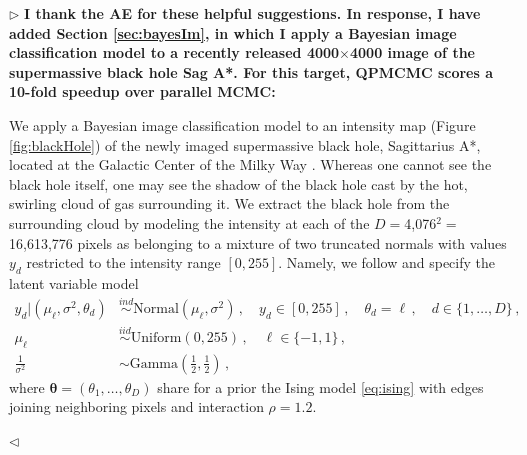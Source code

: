 \documentclass[12pt]{article}
\newenvironment{reply}{$\triangleright$\bfseries}{$\triangleleft$}
\renewenvironment{quote}
               {\list{}{\rightmargin\leftmargin}%
                \item\relax\normalfont}
               {\endlist}
\newcommand{\ttheta}{\boldsymbol{\theta}}
\begin{document}
\begin{reply}
	I thank the AE for these helpful suggestions. In response, I have added Section \ref{sec:bayesIm}, in which I apply a Bayesian image classification model to a recently released 4000$\times$4000 image of the supermassive black hole Sag A*.  For this target, QPMCMC scores a 10-fold speedup over parallel MCMC:
	\begin{quote}
		We apply a Bayesian image classification model to an intensity map (Figure \ref{fig:blackHole}) of the newly imaged supermassive black hole, Sagittarius A*, located at the Galactic Center of the Milky Way \citep{akiyama2022first}.  Whereas one cannot see the black hole itself, one may see the shadow of the black hole cast by the hot, swirling cloud of gas surrounding it.  We extract the black hole from the surrounding cloud by modeling the intensity at each of the $D=$4,076$^2=$16,613,776 pixels as belonging to a mixture of two truncated normals with values $y_{d}$ restricted to the intensity range $[0,255]$.  Namely, we follow \citet{hurn1997difficulties} and specify the latent variable model
		\begin{align*}
			y_d |(\mu_\ell, \sigma^2, \theta_d) &\stackrel{ind}{\sim} \mbox{Normal}(\mu_\ell,\sigma^2 ) \, ,\quad y_d \in [0,255] \, , \quad \theta_d=\ell \,,\quad d\in \{1,\dots,D\}\, ,\\
			\mu_\ell &\stackrel{iid}{\sim} \mbox{Uniform} (0,255) \,  , \quad \ell \in \{-1,1\} \, , \\
			\frac{1}{\sigma^2} &\sim  \mbox{Gamma}\left(\frac{1}{2}, \frac{1}{2} \right)  \, ,
		\end{align*}
		where $\ttheta=(\theta_1,\dots,\theta_D)$ share for a prior the Ising model \eqref{eq:ising} with edges joining neighboring pixels and interaction $\rho=1.2$. 
		

\end{quote}
\end{reply}
\end{document}
